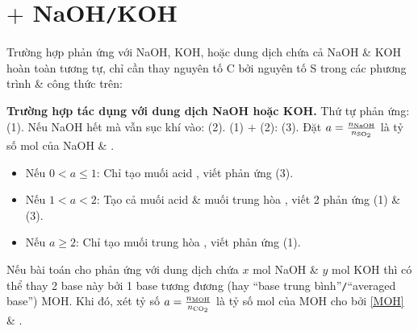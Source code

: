 \documentclass{article}
\begin{document}
\section{ $+$ NaOH{\tt/}KOH}
Trường hợp  phản ứng với NaOH, KOH, hoặc dung dịch chứa cả NaOH \& KOH hoàn toàn tương tự, chỉ cần thay nguyên tố C bởi nguyên tố S trong các phương trình \& công thức trên:
\vspace{2mm}

\noindent\textbf{\textsf{Trường hợp  tác dụng với dung dịch NaOH hoặc KOH.}} Thứ tự phản ứng:  (1). Nếu NaOH hết mà vẫn sục khí  vào:  (2). (1) $+$ (2):  (3). Đặt $a = \frac{n_{\rm NaOH}}{n_{\ce{SO2}}}$ là tỷ số mol của NaOH \& .
\begin{itemize}
	\item Nếu $0 < a\le 1$: Chỉ tạo muối acid , viết phản ứng (3).
	\item Nếu $1 < a < 2$: Tạo cả muối acid  \& muối trung hòa , viết 2 phản ứng (1) \& (3).
	\item Nếu $a\ge 2$: Chỉ tạo muối trung hòa , viết phản ứng (1).
\end{itemize}
Nếu bài toán cho  phản ứng với dung dịch chứa $x$ mol NaOH \& $y$ mol KOH thì có thể thay 2 base này bởi 1 base tương đương (hay ``base trung bình''{\tt/}``averaged base'') MOH. Khi đó, xét tỷ số $a = \frac{n_{\rm MOH}}{n_{\ce{CO2}}}$ là tỷ số mol của MOH cho bởi \eqref{MOH} \& .

\end{document}
